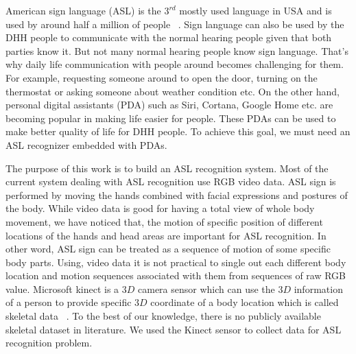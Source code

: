\documentclass[10pt,twocolumn,letterpaper]{article}
\begin{document}
American sign language (ASL) is the $3^{rd}$ mostly used language in USA and is used by around half a million of people ~\cite{sign_lang_study}. Sign language can also be used by the DHH people to communicate with the normal hearing people given that both parties know it. But not many normal hearing people know sign language. That's why daily life communication with people around becomes challenging for them. For example, requesting someone around to open the door, turning on the thermostat or asking someone about weather condition etc. On the other hand, personal digital assistants (PDA) such as Siri, Cortana, Google Home etc. are becoming popular in making life easier for people. These PDAs can be used to make better quality of life for DHH people. To achieve this goal, we must need an ASL recognizer embedded with PDAs.

The purpose of this work is to build an ASL recognition system. Most of the current  system dealing with ASL recognition use RGB video data. ASL sign is performed by moving the hands combined with facial expressions and postures of the body. While video data is good for having a total view of whole body movement, we have noticed that, the motion of specific position of different locations of the hands and head areas are important for ASL recognition. In other word, ASL sign can be treated as a sequence of motion of some specific body parts. Using, video data it is not practical to single out each different body location and motion sequences associated with them from sequences of raw RGB value. Microsoft kinect is a $3D$ camera sensor which can use the $3D$ information of a person to provide specific $3D$ coordinate of a body location which is called skeletal data ~\cite{Zhang:2012:MKS:2225053.2225203}. To the best of our knowledge, there is no publicly available skeletal dataset in literature. We used the Kinect sensor to collect data for ASL recognition problem. 
\end{document}
